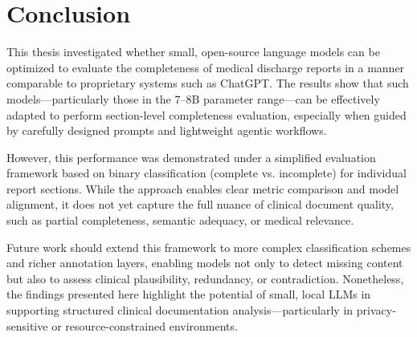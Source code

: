 \section{Conclusion}
This thesis investigated whether small, open-source language models can be optimized to evaluate the completeness of medical discharge reports in a manner comparable to proprietary systems such as ChatGPT. The results show that such models—particularly those in the 7–8B parameter range—can be effectively adapted to perform section-level completeness evaluation, especially when guided by carefully designed prompts and lightweight agentic workflows.

However, this performance was demonstrated under a simplified evaluation framework based on binary classification (complete vs. incomplete) for individual report sections. While the approach enables clear metric comparison and model alignment, it does not yet capture the full nuance of clinical document quality, such as partial completeness, semantic adequacy, or medical relevance.

Future work should extend this framework to more complex classification schemes and richer annotation layers, enabling models not only to detect missing content but also to assess clinical plausibility, redundancy, or contradiction. Nonetheless, the findings presented here highlight the potential of small, local LLMs in supporting structured clinical documentation analysis—particularly in privacy-sensitive or resource-constrained environments.

